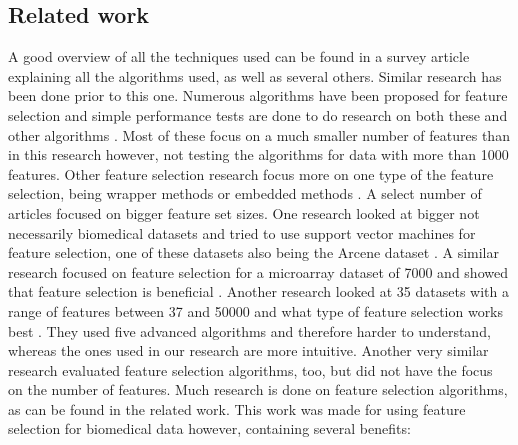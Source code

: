 \documentclass[10pt,a4paper]{report}
\begin{document}
	\subsection{Related work}
	
	A good overview of all the techniques used can be found in a survey article \cite{saeys2007review} explaining all the algorithms used, as well as several others.
	Similar research has been done prior to this one. Numerous algorithms have been proposed for feature selection \cite{lim2003planar, peng2010novel, biesiada2007feature, ding2005minimum, donoho2008higher, SENAWI201747} and simple performance tests are done to do research on both these and other algorithms \cite{baumgartner2006data, catal2009investigating, liu2002comparative, CATAL20091040, huang2013automated}. Most of these focus on a much smaller number of features than in this research however, not testing the algorithms for data with more than 1000 features. Other feature selection research focus more on one type of the feature selection, being wrapper methods \cite{tsamardinos2017massively, el2009new, radovic2017minimum} or embedded methods \cite{jong2004feature}. 
	A select number of articles focused on bigger feature set sizes. One research looked at bigger not necessarily biomedical datasets and tried to use support vector machines for feature selection, one of these datasets also being the Arcene dataset \cite{chen2006combining}. A similar research focused on feature selection for a microarray dataset of 7000 and showed that feature selection is beneficial \cite{xing2001feature}. Another research looked at 35 datasets with a range of features between 37 and 50000 and what type of feature selection works best \cite{song2013fast}. They used five advanced algorithms and therefore harder to understand, whereas the ones used in our research are more intuitive. Another very similar research evaluated feature selection algorithms, too, but did not have the focus on the number of features.
	Much research is done on feature selection algorithms, as can be found in the related work. This work was made for using feature selection for biomedical data however, containing several benefits:
\end{document}
